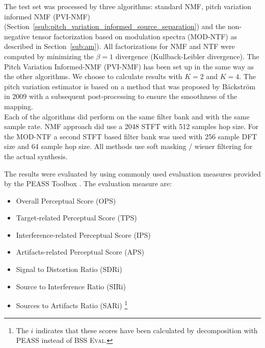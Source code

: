 
The test set was processed by three algorithms: standard NMF, pitch variation informed NMF (PVI-NMF) (Section~\ref{ssub:pitch_variation_informed_source_separation}) and the non-negative tensor factorization based on modulation spectra (MOD-NTF) as described in Section~\ref{sub:am}). All factorizations for NMF and NTF were computed by minimizing the $\beta = 1$ divergence (Kullback-Leibler divergence). The Pitch Variation Informed-NMF (PVI-NMF) has been set up in the same way as the other algorithms. We choose to calculate results with $K=2$ and $K=4$. The pitch variation estimator is based on a method that was proposed by B\"ackstr\"om in 2009 \cite{backstrom2009pitch} with a subsequent post-processing to ensure the smoothness of the mapping. \\

Each of the algorithms did perform on the same filter bank and with the same sample rate. NMF approach did use a 2048 STFT with 512 samples hop size. For the MOD-NTF a second STFT based filter bank was used with 256 sample DFT size and 64 sample hop size. All methods use soft masking / wiener filtering for the actual synthesis.


The results were evaluated by using commonly used evaluation measures provided by the PEASS Toolbox \cite{emiya2011subjective}. The evaluation measure are:

\begin{itemize}
  \item Overall Perceptual Score (OPS)
  \item Target-related Perceptual Score (TPS)
  \item Interference-related Perceptual Score (IPS)
  \item Artifacts-related Perceptual Score (APS)
  \item Signal to Distortion Ratio (SDRi)
  \item Source to Interference Ratio (SIRi)
  \item Sources to Artifacts Ratio (SARi) \footnote{The $i$ indicates that these scores have been calculated by decomposition with PEASS \cite{emiya2011subjective} instead of \textsc{BSS Eval}.}
\end{itemize}

